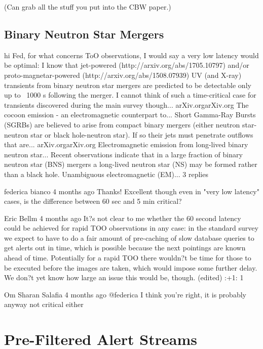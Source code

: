 \documentclass[DM,lsstdraft,authoryear,toc]{lsstdoc}
\begin{document}
(Can grab all the stuff you put into the CBW paper.)

\subsection{Binary Neutron Star Mergers}


hi Fed, for what concerns ToO observations, I would say a very low latency would be optimal: I know that jet-powered (http://arxiv.org/abs/1705.10797) and/or proto-magnetar-powered (http://arxiv.org/abs/1508.07939) UV (and X-ray) transients from binary neutron star mergers are predicted to be detectable only up to ~1000 s following the merger. I cannot think of such a time-critical case for transients discovered during the main survey though...
arXiv.orgarXiv.org
The cocoon emission - an electromagnetic counterpart to...
Short Gamma-Ray Bursts (SGRBs) are believed to arise from compact binary mergers (either neutron star-neutron star or black hole-neutron star). If so their jets must penetrate outflows that are...
arXiv.orgarXiv.org
Electromagnetic emission from long-lived binary neutron star...
Recent observations indicate that in a large fraction of binary neutron star (BNS) mergers a long-lived neutron star (NS) may be formed rather than a black hole. Unambiguous electromagnetic (EM)...
3 replies

federica bianco  4 months ago
Thanks! Excellent though even in "very low latency" cases, is the difference between 60 sec and 5 min critical?

Eric Bellm  4 months ago
It?s not clear to me whether the 60 second latency could be achieved for rapid TOO observations in any case: in the standard survey we expect to have to do a fair amount of pre-caching of slow database queries to get alerts out in time, which is possible because the next pointings are known ahead of time.  Potentially for a rapid TOO there wouldn?t be time for those to be executed before the images are taken, which would impose some further delay.  We don?t yet know how large an issue this would be, though. (edited) 
:+1:
1


Om Sharan Salafia  4 months ago
@federica I think you're right, it is probably anyway not critical either



\section{Pre-Filtered Alert Streams} \label{sec:prefilter}
\end{document}
